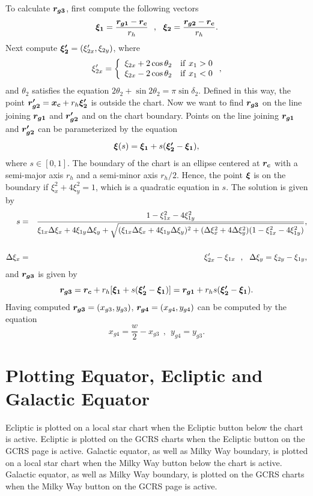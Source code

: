\documentclass[12pt]{article}
\newcommand \beq {\begin{equation}}
\newcommand \eeq {\end{equation}}
\newcommand \beqn {\begin{eqnarray}}
\newcommand \eeqn {\end{eqnarray}}
\newcommand{\ve}[1]{\mbox{\boldmath $#1$}}
\begin{document}
To calculate $\ve{r_{g3}}$, first compute the following vectors 
\beq
  \ve{\xi_1} = \frac{\ve{r_{g1}}-\ve{r_c}}{r_h} \ \ , \ \ 
  \ve{\xi_2} = \frac{\ve{r_{g2}}-\ve{r_c}}{r_h} .
\eeq
Next compute $\ve{\xi'_2} = (\xi'_{2x} , \xi_{2y})$, where 
\beq
  \xi'_{2x} = \left \{ \begin{array}{ll} \xi_{2x} + 2\cos \theta_2 & {\rm if }~x_1>0 \\ 
\xi_{2x} -2\cos \theta_2 & {\rm if }~x_1 < 0 \end{array} \right. ,
\eeq
and $\theta_2$ satisfies the equation $2\theta_2 + \sin 2\theta_2 = \pi \sin \delta_2$. 
Defined in this way, the point $\ve{r'_{g2}}=\ve{x_c}+r_h \ve{\xi'_2}$ is outside the 
chart. Now we want to find $\ve{r_{g3}}$ on the line joining $\ve{r_{g1}}$ and 
$\ve{r'_{g2}}$ and on the chart boundary. Points on the line joining 
$\ve{r_{g1}}$ and $\ve{r'_{g2}}$ can be parameterized by the equation 
\beq
  \ve{\xi}(s) = \ve{\xi_1} + s(\ve{\xi'_2} - \ve{\xi_1}) , 
\eeq
where $s \in [0,1]$. The boundary of the chart is an ellipse centered at $\ve{r_c}$ 
with a semi-major axis $r_h$ and a semi-minor axis $r_h/2$. Hence, 
the point $\ve{\xi}$ is on the boundary if $\xi_x^2 + 4\xi_y^2=1$, which is a quadratic 
equation in $s$. The solution is given by 
\beqn
  s &=& \frac{1-\xi_{1x}^2 - 4\xi_{1y}^2}{\xi_{1x}\Delta \xi_x + 4\xi_{1y} \Delta \xi_y 
+ \sqrt{(\xi_{1x}\Delta \xi_x + 4\xi_{1y}\Delta \xi_y)^2 + 
(\Delta \xi_x^2 + 4\Delta \xi_y^2)(1-\xi_{1x}^2 - 4\xi_{1y}^2)}} , \cr \cr 
 \Delta \xi_x &=& \xi'_{2x}-\xi_{1x} \ \ , \ \ 
 \Delta \xi_y = \xi_{2y} - \xi_{1y} ,
\eeqn
and $\ve{r_{g3}}$ is given by 
\beq
  \ve{r_{g3}} = \ve{r_c} + r_h[\ve{\xi_1} + s(\ve{\xi'_2}-\ve{\xi_1})] 
 = \ve{r_{g1}} + r_h s (\ve{\xi'_2}-\ve{\xi_1}) .
\eeq
Having computed $\ve{r_{g3}}=(x_{g3},y_{g3})$, $\ve{r_{g4}}=(x_{g4},y_{g4})$ 
can be computed by the equation 
\beq
  x_{g4} = \frac{w}{2}-x_{g3} \ \ , \ \ y_{g4} = y_{g3} .
\eeq

\section{Plotting Equator, Ecliptic and Galactic Equator} 

Ecliptic is plotted on a local star chart when the Ecliptic button below 
the chart is active. Ecliptic is plotted on the GCRS charts when the 
Ecliptic button on the GCRS page is active. Galactic equator, as well as 
Milky Way boundary, is plotted 
on a local star chart when the Milky Way button below the chart is active. 
Galactic equator, as well as Milky Way boundary, is plotted on the GCRS 
charts when the Milky Way button on the GCRS page is active. 
\end{document}
